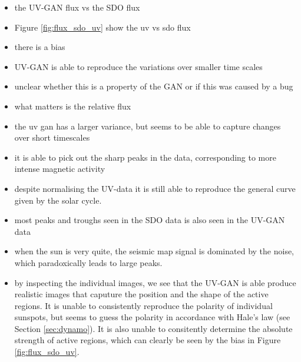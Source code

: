 \documentclass[11pt,a4paper,onecolumn]{report}
\begin{document}
\begin{itemize}
  \item the UV-GAN flux vs the SDO flux
  \item Figure \ref{fig:flux_sdo_uv} show the uv vs sdo flux
  \item there is a bias
  \item UV-GAN is able to reproduce the variations over smaller time scales
  \item unclear whether this is a property of the GAN or if this was caused by a
  bug
  \item what matters is the relative flux
  \item the uv gan has a larger variance, but seems to be able to capture changes
  over short timescales
  \item it is able to pick out the sharp peaks in the data, corresponding to
  more intense magnetic activity
  \item despite normalising the UV-data it is still able to reproduce the
  general curve given by the solar cycle.

  \item most peaks and troughs seen in the SDO data is also seen in the UV-GAN data
  
  \item when the sun is very quite, the seismic map signal is dominated by the
  noise, which paradoxically leads to large peaks. 

  \item by inspecting the individual images, we see that the UV-GAN is able
  produce realistic images that caputure the position and the shape of the
  active regions. It is unable to consistently reproduce the polarity of
  individual sunspots, but seems to guess the polarity in accordance with Hale's
  law (see Section \ref{sec:dynamo}). It is also unable to consitently determine
  the absolute strength of active regions, which can clearly be seen by the bias
  in Figure \ref{fig:flux_sdo_uv}.
\end{itemize}
\end{document}
